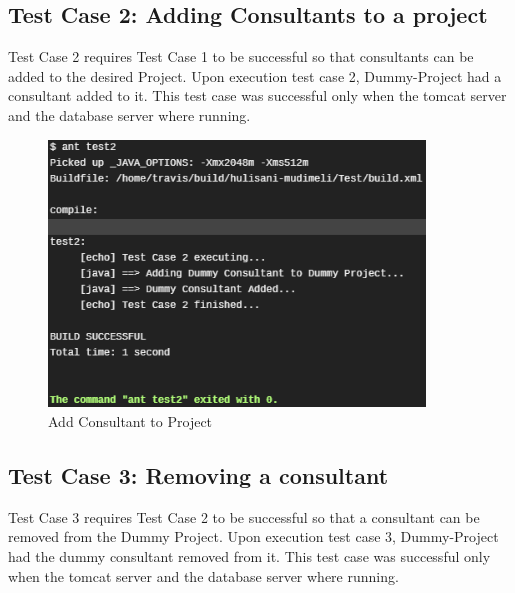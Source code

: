 \documentclass[a4paper, 12pt, oneside]{article}
\begin{document}
\subsection{Test Case 2: Adding Consultants to a project}

Test Case 2 requires Test Case 1 to be successful so that consultants can be added to the desired Project. Upon execution test case 2, Dummy-Project had a consultant added to it. This test case was successful only when the tomcat server and the database server where running.

\begin{figure}[!htb]

\centering

\includegraphics[width=10cm]{images/test2.png}

\caption{Add Consultant to Project}

\label{fig:sfig1}

\end{figure}


\subsection{Test Case 3: Removing a consultant}

Test Case 3 requires Test Case 2 to be successful so that a consultant can be removed from the Dummy Project. Upon execution test case 3, Dummy-Project had the dummy consultant removed from it. This test case was successful only when the tomcat server and the database server where running.
\end{document}
